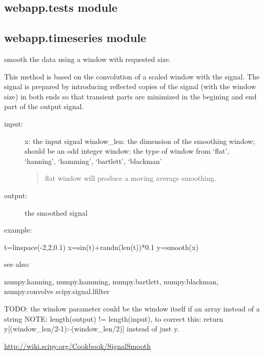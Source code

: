 \documentclass[letterpaper,10pt,english]{sphinxmanual}
\begin{document}
\subsection{webapp.tests module}
\label{modules/webapp:module-webapp.tests}\label{modules/webapp:webapp-tests-module}

\subsection{webapp.timeseries module}
\label{modules/webapp:module-webapp.timeseries}\label{modules/webapp:webapp-timeseries-module}

\begin{fulllineitems}
\label{modules/webapp:webapp.timeseries.smooth}
smooth the data using a window with requested size.

This method is based on the convolution of a scaled window with the signal.
The signal is prepared by introducing reflected copies of the signal 
(with the window size) in both ends so that transient parts are minimized
in the begining and end part of the output signal.
\begin{description}
\item[{input:}] \leavevmode
x: the input signal 
window\_len: the dimension of the smoothing window; should be an odd integer
window: the type of window from `flat', `hanning', `hamming', `bartlett', `blackman'
\begin{quote}

flat window will produce a moving average smoothing.
\end{quote}

\item[{output:}] \leavevmode
the smoothed signal

\end{description}

example:

t=linspace(-2,2,0.1)
x=sin(t)+randn(len(t))*0.1
y=smooth(x)

see also:

numpy.hanning, numpy.hamming, numpy.bartlett, numpy.blackman, numpy.convolve
scipy.signal.lfilter

TODO: the window parameter could be the window itself if an array instead of a string
NOTE: length(output) != length(input), to correct this: return y{[}(window\_len/2-1):-(window\_len/2){]} instead of just y.

\href{http://wiki.scipy.org/Cookbook/SignalSmooth}{http://wiki.scipy.org/Cookbook/SignalSmooth}

\end{fulllineitems}
\end{document}
